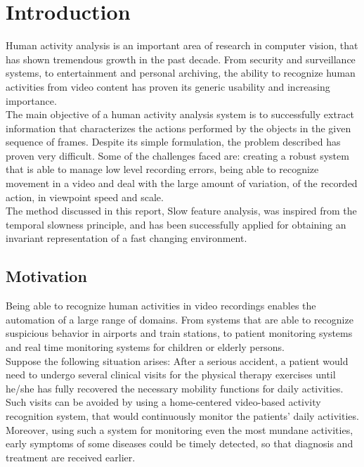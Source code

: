 \documentclass[11pt]{report}
\begin{document}
\chapter{Introduction}

Human activity analysis is an important area of research in computer vision, that has shown tremendous growth in the past decade. From security and surveillance systems, to entertainment and personal archiving, the ability to recognize human activities from video content has proven its generic usability and increasing importance. \\
The main objective of a human activity analysis system is to successfully extract information that characterizes the actions performed by the objects in the given sequence of frames. Despite its simple formulation, the problem described has proven very difficult. Some of the challenges faced are: creating a robust system that is able to manage low level recording errors, being able to recognize movement in a video and deal with the large amount of variation, of the recorded action, in viewpoint speed and scale. \\
The method discussed in this report, Slow feature analysis, was inspired from the temporal slowness principle, and has been successfully applied for obtaining an invariant representation of a fast changing environment. \\

\section{Motivation}

Being able to recognize human activities in video recordings enables the automation of a large range of domains. From systems that are able to recognize suspicious behavior in airports and train stations, to patient monitoring systems and real time monitoring systems for children or elderly persons. \\
Suppose the following situation arises: After a serious accident, a patient would need to undergo several clinical visits for the physical therapy exercises until he/she has fully recovered the necessary mobility functions for daily activities. Such visits can be avoided by using a home-centered video-based activity recognition system, that would continuously monitor the patients’ daily activities. Moreover, using such a system for monitoring even the most mundane activities, early symptoms of some diseases could be timely detected, so that diagnosis and treatment are received earlier. \\
\end{document}
